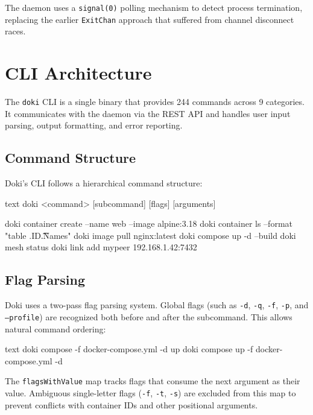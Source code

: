 The daemon uses a \texttt{signal(0)} polling mechanism to detect
process termination, replacing the earlier \texttt{ExitChan} approach
that suffered from channel disconnect races.

\section{CLI Architecture}
\label{sec:cli}

The \texttt{doki} CLI is a single binary that provides 244 commands
across 9 categories. It communicates with the daemon via the REST API
and handles user input parsing, output formatting, and error reporting.

\subsection{Command Structure}
\label{sec:command-structure}

Doki's CLI follows a hierarchical command structure:

\begin{codebox}[title={CLI command hierarchy}]{text}
doki <command> [subcommand] [flags] [arguments]

doki container create   --name web --image alpine:3.18
doki container ls       --format "table {{.ID}}\t{{.Names}}"
doki image pull         nginx:latest
doki compose up         -d --build
doki mesh status
doki link add           mypeer 192.168.1.42:7432
\end{codebox}

\subsection{Flag Parsing}
\label{sec:flag-parsing}

Doki uses a two-pass flag parsing system. Global flags (such as
\texttt{-d}, \texttt{-q}, \texttt{-f}, \texttt{-p}, and
\texttt{--profile}) are recognized both before and after the
subcommand. This allows natural command ordering:

\begin{codebox}[title={Equivalent flag positions}]{text}
doki compose -f docker-compose.yml -d up
doki compose up -f docker-compose.yml -d
\end{codebox}

The \texttt{flagsWithValue} map tracks flags that consume the next
argument as their value. Ambiguous single-letter flags (\texttt{-f},
\texttt{-t}, \texttt{-s}) are excluded from this map to prevent
conflicts with container IDs and other positional arguments.

